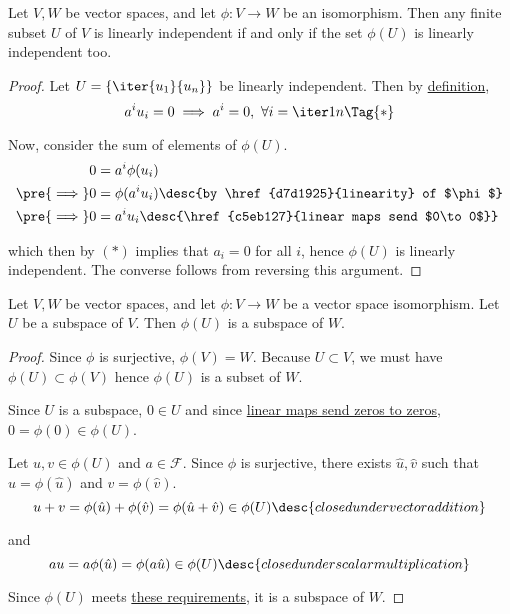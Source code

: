 \label{a6b2211}

\cvn Let $V,W$ be vector spaces, and let $\phi:V\to W$ be an isomorphism. Then
any finite subset $U$ of $V$ is linearly independent if and only if the set
$\phi(U)$ is linearly independent too.

\begin{proof}
  Let $U=\{\iter{u_1}{u_n}\}$ be linearly independent. Then by
  \href{c133a44}{definition},
  \begin{equation*}
    a^iu_i=0\implies a^i=0,\ \forall i=\iter1n\Tag{*}
  \end{equation*}

  Now, consider the sum of elements of $\phi(U)$.
  \begin{align*}
    0               &=a^i\phi(u_i)                                              \\
    \pre{\implies}0 &=\phi(a^iu_i)\desc{by \href{d7d1925}{linearity} of $\phi$} \\
    \pre{\implies}0 &=a^iu_i\desc{\href{c5eb127}{linear maps send $0\to0$}}
  \end{align*}

  which then by $(*)$ implies that $a_i=0$ for all $i$, hence $\phi(U)$ is
  linearly independent. The converse follows from reversing this argument.
\end{proof}

\label{b499a29}

Let $V,W$ be vector spaces, and let $\phi:V\to W$ be a vector space
isomorphism. Let $U$ be a subspace of $V$. Then $\phi(U)$ is a subspace of $W$.

\begin{proof}
  Since $\phi$ is surjective, $\phi(V)=W$. Because $U\subset V$, we must have
  $\phi(U)\subset\phi(V)$ hence $\phi(U)$ is a subset of $W$.

  Since $U$ is a subspace, $0\in U$ and since \href{c5eb127}{linear maps send
  zeros to zeros}, $0=\phi(0)\in\phi(U)$.

  Let $u,v\in\phi(U)$ and $a\in\mathcal F$. Since $\phi$ is surjective, there
  exists $\hat u,\hat v$ such that $u=\phi(\hat u)$ and $v=\phi(\hat v)$.
  $$
    u+v=\phi(\hat u)+\phi(\hat v)=\phi(\hat u+\hat v)\in\phi(U)\desc{closed under vector addition}
  $$

  and
  $$
    au=a\phi(\hat u)=\phi(a\hat u)\in\phi(U)\desc{closed under scalar multiplication}
  $$

  Since $\phi(U)$ meets \href{dea139b}{these requirements}, it is a subspace of
  $W$.
\end{proof}

